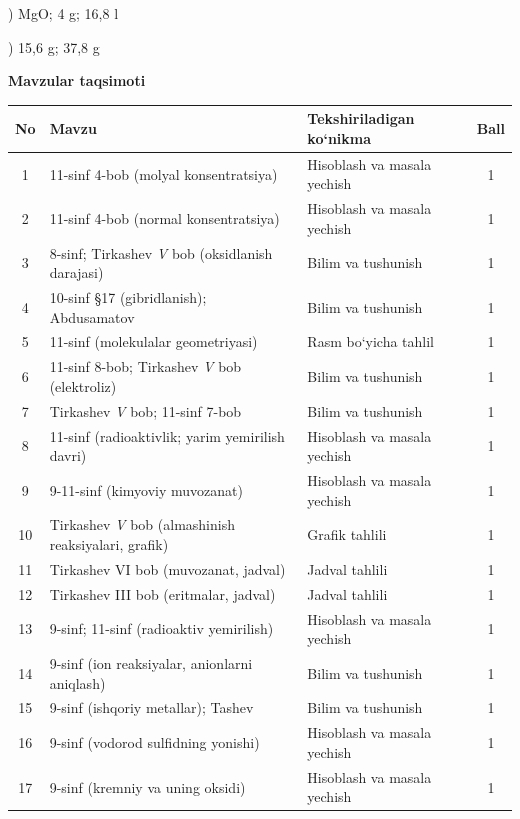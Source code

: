 \documentclass[11pt,a4paper]{article}
\begin{document}
) MgO; 4 g; 16,8 l\par
{}) 15,6 g; 37,8 g\par
\par\bigskip\noindent\textbf{Mavzular taqsimoti}\par\smallskip
{\small\noindent\begin{longtable}{|c|p{7.2cm}|p{5.4cm}|c|}\hline \textbf{No} & \textbf{Mavzu} & \textbf{Tekshiriladigan ko`nikma} & \textbf{Ball}\\\hline
1 & 11-sinf 4-bob (molyal konsentratsiya) & Hisoblash va masala yechish & 1\\\hline
2 & 11-sinf 4-bob (normal konsentratsiya) & Hisoblash va masala yechish & 1\\\hline
3 & 8-sinf; Tirkashev \textit{V} bob (oksidlanish darajasi) & Bilim va tushunish & 1\\\hline
4 & 10-sinf \S{}17 (gibridlanish); Abdusamatov & Bilim va tushunish & 1\\\hline
5 & 11-sinf (molekulalar geometriyasi) & Rasm bo`yicha tahlil & 1\\\hline
6 & 11-sinf 8-bob; Tirkashev \textit{V} bob (elektroliz) & Bilim va tushunish & 1\\\hline
7 & Tirkashev \textit{V} bob; 11-sinf 7-bob & Bilim va tushunish & 1\\\hline
8 & 11-sinf (radioaktivlik; yarim yemirilish davri) & Hisoblash va masala yechish & 1\\\hline
9 & 9-11-sinf (kimyoviy muvozanat) & Hisoblash va masala yechish & 1\\\hline
10 & Tirkashev \textit{V} bob (almashinish reaksiyalari, grafik) & Grafik tahlili & 1\\\hline
11 & Tirkashev VI bob (muvozanat, jadval) & Jadval tahlili & 1\\\hline
12 & Tirkashev III bob (eritmalar, jadval) & Jadval tahlili & 1\\\hline
13 & 9-sinf; 11-sinf (radioaktiv yemirilish) & Hisoblash va masala yechish & 1\\\hline
14 & 9-sinf (ion reaksiyalar, anionlarni aniqlash) & Bilim va tushunish & 1\\\hline
15 & 9-sinf (ishqoriy metallar); Tashev & Bilim va tushunish & 1\\\hline
16 & 9-sinf (vodorod sulfidning yonishi) & Hisoblash va masala yechish & 1\\\hline
17 & 9-sinf (kremniy va uning oksidi) & Hisoblash va masala yechish & 1\\\hline

\end{longtable}}
\end{document}
